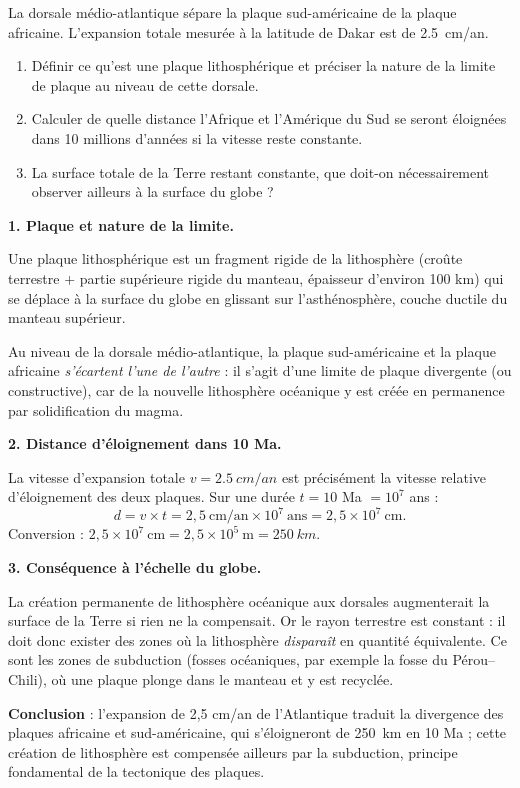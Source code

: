 \documentclass[11pt]{article}
\newcommand{\cle}[1]{{\popxbold\color{popdark}#1}}
\begin{document}
\begin{exoresolu}
La dorsale médio-atlantique sépare la plaque sud-américaine de la plaque africaine. L'expansion totale mesurée à la latitude de Dakar est de \SI{2,5}{cm/an}.
\begin{enumerate}
\item Définir ce qu'est une plaque lithosphérique et préciser la nature de la limite de plaque au niveau de cette dorsale.
\item Calculer de quelle distance l'Afrique et l'Amérique du Sud se seront éloignées dans 10 millions d'années si la vitesse reste constante.
\item La surface totale de la Terre restant constante, que doit-on nécessairement observer ailleurs à la surface du globe ?
\end{enumerate}
\tcblower
\textbf{1. Plaque et nature de la limite.}

Une \cle{plaque lithosphérique} est un fragment rigide de la lithosphère (croûte terrestre + partie supérieure rigide du manteau, épaisseur d'environ 100 km) qui se déplace à la surface du globe en glissant sur l'asthénosphère, couche ductile du manteau supérieur.

Au niveau de la dorsale médio-atlantique, la plaque sud-américaine et la plaque africaine \emph{s'écartent l'une de l'autre} : il s'agit d'une limite de plaque \cle{divergente} (ou constructive), car de la nouvelle lithosphère océanique y est créée en permanence par solidification du magma.

\textbf{2. Distance d'éloignement dans 10 Ma.}

La vitesse d'expansion totale $v = \SI{2,5}{cm/an}$ est précisément la vitesse relative d'éloignement des deux plaques. Sur une durée $t = 10$ Ma $= 10^{7}$ ans :
\[ d = v \times t = 2{,}5\ \text{cm/an} \times 10^{7}\ \text{ans} = 2{,}5 \times 10^{7}\ \text{cm}. \]
Conversion : $2{,}5 \times 10^{7}\ \text{cm} = 2{,}5 \times 10^{5}\ \text{m} = \SI{250}{km}$.

\textbf{3. Conséquence à l'échelle du globe.}

La création permanente de lithosphère océanique aux dorsales augmenterait la surface de la Terre si rien ne la compensait. Or le rayon terrestre est constant : il doit donc exister des zones où la lithosphère \emph{disparaît} en quantité équivalente. Ce sont les zones de \cle{subduction} (fosses océaniques, par exemple la fosse du Pérou--Chili), où une plaque plonge dans le manteau et y est recyclée.

\textbf{Conclusion} : l'expansion de 2,5 cm/an de l'Atlantique traduit la divergence des plaques africaine et sud-américaine, qui s'éloigneront de \SI{250}{km} en 10 Ma ; cette création de lithosphère est compensée ailleurs par la subduction, principe fondamental de la \cle{tectonique des plaques}.
\end{exoresolu}
\end{document}
